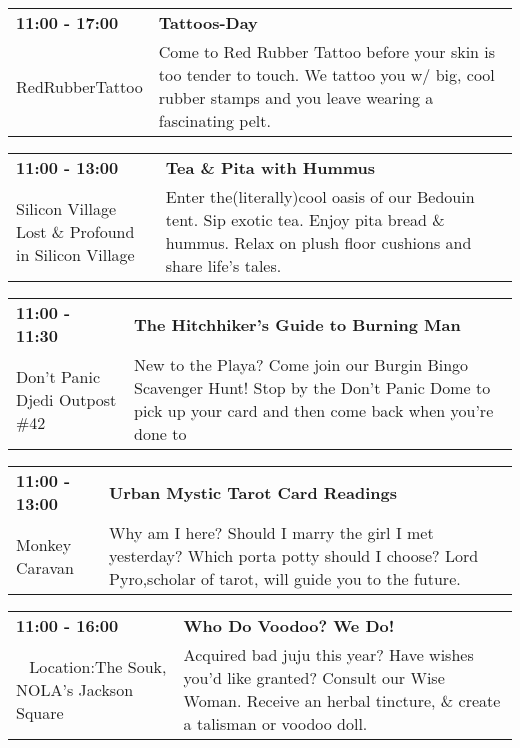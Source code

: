 \begin{tabular}{ p{1in} p{2.2in} }
    \textbf{11:00 - 17:00} & \textbf{Tattoos-Day} \\
    RedRubberTattoo \newline  & Come to Red Rubber Tattoo before your skin is too tender to touch. We tattoo you w/ big, cool rubber stamps and you leave wearing a fascinating pelt. \\
    \hline 
\end{tabular}
    
\begin{tabular}{ p{1in} p{2.2in} }
    \textbf{11:00 - 13:00} & \textbf{Tea \& Pita with Hummus} \\
    Silicon Village \newline Lost \& Profound in Silicon Village & Enter the(literally)cool oasis of our Bedouin tent. Sip exotic tea. Enjoy pita bread \& hummus. Relax on plush floor cushions and share life's tales. \\
    \hline 
\end{tabular}
    
\begin{tabular}{ p{1in} p{2.2in} }
    \textbf{11:00 - 11:30} & \textbf{The Hitchhiker's Guide to Burning Man } \\
    Don't Panic Djedi Outpost \#42 \newline  & New to the Playa? Come join our Burgin Bingo Scavenger Hunt! Stop by the Don't Panic Dome to pick up your card and then come back when you're done to \\
    \hline 
\end{tabular}
    
\begin{tabular}{ p{1in} p{2.2in} }
    \textbf{11:00 - 13:00} & \textbf{Urban Mystic Tarot Card Readings} \\
    Monkey Caravan \newline  & Why am I here? Should I marry the girl I met yesterday? Which porta potty should I choose? Lord Pyro,scholar of tarot, will guide you to the future. \\
    \hline 
\end{tabular}
    
\begin{tabular}{ p{1in} p{2.2in} }
    \textbf{11:00 - 16:00} & \textbf{Who Do Voodoo? We Do!} \\
    ~ \newline Location:The Souk, NOLA's Jackson Square  & Acquired bad juju this year? Have wishes you'd like granted? Consult our Wise Woman. Receive an herbal tincture, \& create a talisman or voodoo doll. \\
    \hline 
\end{tabular}
    
